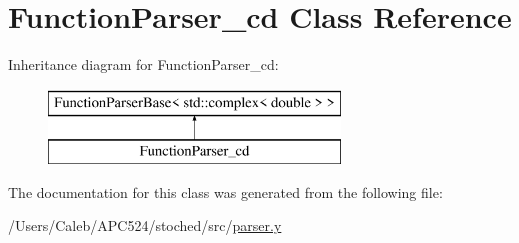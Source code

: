 \hypertarget{class_function_parser__cd}{}\section{Function\+Parser\+\_\+cd Class Reference}
\label{class_function_parser__cd}
Inheritance diagram for Function\+Parser\+\_\+cd\+:\begin{figure}[H]
\begin{center}
\leavevmode
\includegraphics[height=2.000000cm]{class_function_parser__cd}
\end{center}
\end{figure}


The documentation for this class was generated from the following file\+:\begin{DoxyCompactItemize}
\item 
/\+Users/\+Caleb/\+A\+P\+C524/stoched/src/\hyperlink{parser_8y}{parser.\+y}\end{DoxyCompactItemize}
